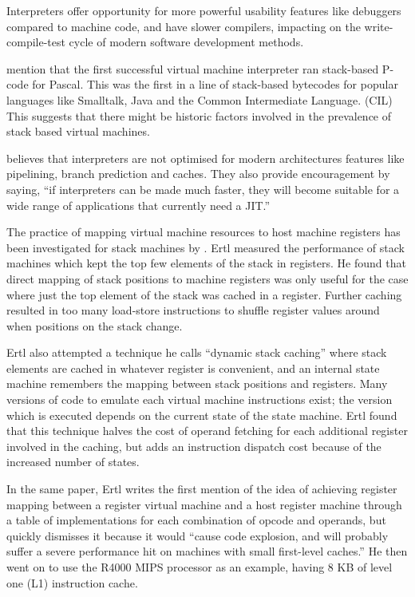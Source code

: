 		Interpreters offer opportunity for more powerful usability features like debuggers compared to machine code, and have slower compilers, impacting on the write-compile-test cycle of modern software development methods.
		
		\cite{caseregistervm} mention that the first successful virtual machine interpreter ran stack-based P-code for Pascal. This was the first in a line of stack-based bytecodes for popular languages like Smalltalk, Java and the Common Intermediate Language. (CIL) This suggests that there might be historic factors involved in the prevalence of stack based virtual machines.
		
		\cite{fastjava} believes that interpreters are not optimised for modern architectures features like pipelining, branch prediction and caches. They also provide encouragement by saying, ``if interpreters can be made much faster, they will become suitable for a wide range of applications that currently need a JIT.''
		
		
		The practice of mapping virtual machine resources to host machine registers has been investigated for stack machines by \cite{stackcaching}. Ertl measured the performance of stack machines which kept the top few elements of the stack in registers. He found that direct mapping of stack positions to machine registers was only useful for the case where just the top element of the stack was cached in a register. Further caching resulted in too many load-store instructions to shuffle register values around when positions on the stack change.
		
		Ertl also attempted a technique he calls ``dynamic stack caching'' where stack elements are cached in whatever register is convenient, and an internal state machine remembers the mapping between stack positions and registers. Many versions of code to emulate each virtual machine instructions exist; the version which is executed depends on the current state of the state machine. Ertl found that this technique halves the cost of operand fetching for each additional register involved in the caching, but adds an instruction dispatch cost because of the increased number of states.
		
		In the same paper, Ertl writes the first mention of the idea of achieving register mapping between a register virtual machine and a host register machine through a table of implementations for each combination of opcode and operands, but quickly dismisses it because it would ``cause code explosion, and will probably suffer a severe performance hit on machines with small first-level caches.'' He then went on to use the R4000 MIPS processor as an example, having 8 KB of level one (L1) instruction cache.
	
